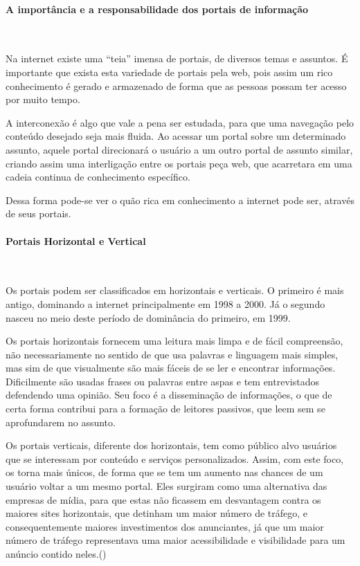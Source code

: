 \paragraph{A importância e a responsabilidade dos portais de informação}\mbox{}\\
\par
Na internet existe uma “teia” imensa de portais, de diversos temas e assuntos. É importante que exista esta variedade de portais pela web, pois assim um rico conhecimento é gerado e armazenado de forma que as pessoas possam ter acesso por muito tempo.

A interconexão é algo que vale a pena ser estudada, para que uma navegação pelo conteúdo desejado seja mais fluida. Ao acessar um portal sobre um determinado assunto, aquele portal direcionará o usuário a um outro portal de assunto similar, criando assim uma interligação entre os portais peça web, que acarretara em uma cadeia continua de conhecimento específico.

Dessa forma pode-se ver o quão rica em conhecimento a internet pode ser, através de seus portais.

\paragraph{Portais Horizontal e Vertical}\mbox{}\\
\par
Os portais podem ser classificados em horizontais e verticais. O primeiro é mais antigo, dominando a internet principalmente em 1998 a 2000. Já o segundo nasceu no meio deste período de dominância do primeiro, em 1999.

Os portais horizontais fornecem uma leitura mais limpa e de fácil compreensão, não necessariamente no sentido de que usa palavras e linguagem mais simples, mas sim de que visualmente são mais fáceis de se ler e encontrar informações. Dificilmente são usadas frases ou palavras entre aspas e tem entrevistados defendendo uma opinião. Seu foco é a disseminação de informações, o que de certa forma contribui para a formação de leitores passivos, que leem sem se aprofundarem no assunto.

Os portais verticais, diferente dos horizontais, tem como público alvo usuários que se interessam por conteúdo e serviços personalizados. Assim, com este foco, os torna mais únicos, de forma que se tem um aumento nas chances de um usuário voltar a um mesmo portal. Eles surgiram como uma alternativa das empresas de mídia, para que estas não ficassem em desvantagem contra os maiores sites horizontais, que detinham um maior número de tráfego, e consequentemente maiores investimentos dos anunciantes, já que um maior número de tráfego representava uma maior acessibilidade e visibilidade para um anúncio contido neles.(\cite{vertical})


